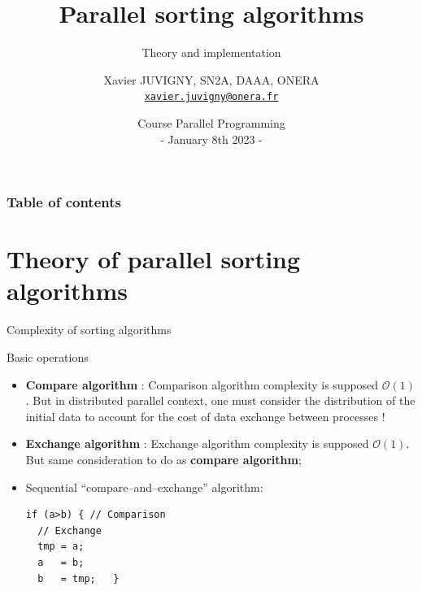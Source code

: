 \documentclass[compress,10pt,aspectratio=169]{beamer}
\title[Parallel programming\hspace{2em}]{Parallel sorting algorithms}
\subtitle{Theory and implementation}
\author[X. JUVIGNY]{Xavier JUVIGNY, SN2A, DAAA, ONERA\\ \href{mailto:xavier.juvigny@onera.fr}{\texttt{xavier.juvigny@onera.fr}} }
\date[01/08/2023]{Course Parallel Programming\\- January 8th 2023 -}
\institute{\inst{1}ONERA,\inst{2}DAAA}
\begin{document}
\MakeTitlePage

\begin{frame}
\frametitle{Table of contents}
\begin{multicols}{2}
\tableofcontents[hideallsubsections]
\end{multicols}
\end{frame}

\section{Theory of parallel sorting algorithms}

\begin{frame}[fragile]{Complexity of sorting algorithms}
  \scriptsize
  \begin{block}{Basic operations}
    \begin{itemize}
    \item \textbf{Compare algorithm} : Comparison algorithm complexity is supposed $\mathcal{O}(1)$. But in distributed parallel context, one must consider the distribution of the initial data
      to account for the cost of data exchange between processes !
    \item  \textbf{Exchange algorithm} : Exchange algorithm complexity is supposed $\mathcal{O}(1)$. But same consideration to do as \textbf{compare algorithm};
    \item Sequential ``compare--and--exchange'' algorithm:
\begin{verbatim}
if (a>b) { // Comparison
  // Exchange
  tmp = a;
  a   = b;
  b   = tmp;   }
\end{verbatim}
    \end{itemize}
  \end{block}
\end{frame}
\end{document}
